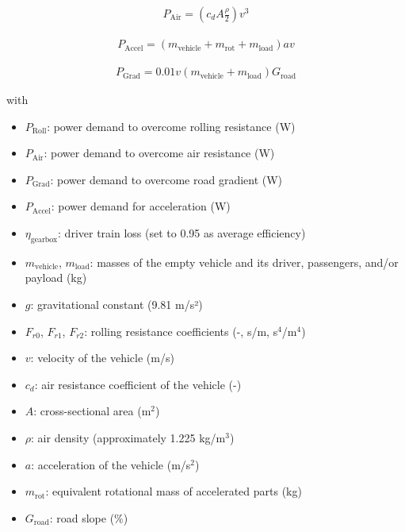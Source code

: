 \begin{align}
   P_{\text{Air}} = \left(c_d A \frac{\rho}{2} \right) v^3 \label{eq:LCBM_P_Air}
\end{align}

\begin{align}
   P_{\text{Accel}} = (m_{\text{vehicle}} + m_{\text{rot}} + m_{\text{load}}) a v \label{eq:LCBM_P_Accel}
\end{align}

\begin{align}
   P_{\text{Grad}} = 0.01 v (m_{\text{vehicle}} + m_{\text{load}}) G_{\text{road}} \label{eq:LCBM_P_Grad}
\end{align}

with

\begin{itemize}
    \item $P_{\text{Roll}}$: power demand to overcome rolling resistance (W)
    \item $P_{\text{Air}}$: power demand to overcome air resistance (W)
    \item $P_{\text{Grad}}$: power demand to overcome road gradient (W)
    \item $P_{\text{Accel}}$: power demand for acceleration (W)

    \item $\eta_{\text{gearbox}}$: driver train loss (set to 0.95 as average efficiency)

    \item $m_{\text{vehicle}}$, $m_{\text{load}}$: masses of the empty vehicle and its driver, passengers, and/or payload (kg)

    \item $g$: gravitational constant (9.81 m/s²)

    \item $F_{r0}$, $F_{r1}$, $F_{r2}$: rolling resistance coefficients (-, s/m, s$^4$/m$^4$)

    \item $v$: velocity of the vehicle (m/s)

    \item $c_d$: air resistance coefficient of the vehicle (-)

    \item $A$: cross-sectional area (m$^2$)

    \item $\rho$: air density (approximately 1.225 kg/m$^3$)

    \item $a$: acceleration of the vehicle (m/s$^2$)

    \item $m_{\text{rot}}$: equivalent rotational mass of accelerated parts (kg)

    \item $G_{\text{road}}$: road slope (\%)
\end{itemize}

